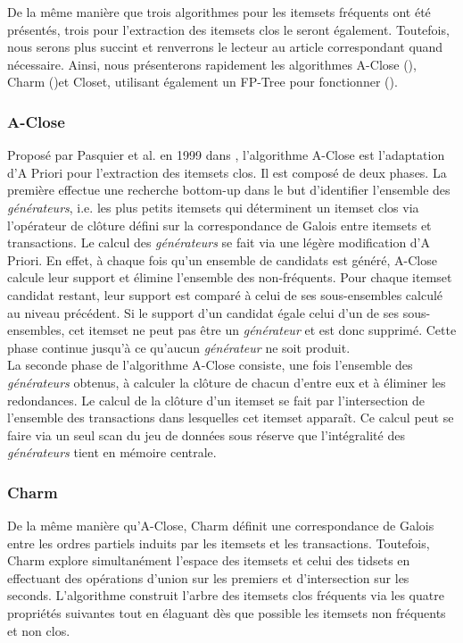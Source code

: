 \documentclass[a4paper,10pt]{report}
\begin{document}
De la même manière que trois algorithmes pour les itemsets fréquents ont été présentés, trois pour l'extraction des itemsets clos le seront également. Toutefois, nous serons plus succint et renverrons le lecteur au article correspondant quand nécessaire. Ainsi, nous présenterons rapidement les algorithmes A-Close (\cite{PAS99}), Charm (\cite{ZAK99})et Closet, utilisant également un FP-Tree pour fonctionner (\cite{PEI00}). \\

\subsubsection{A-Close}
\hspace{0.15cm}Proposé par Pasquier et al. en 1999 dans \cite{PAS99}, l'algorithme A-Close est l'adaptation d'A Priori  pour l'extraction des itemsets clos. Il est composé de deux phases. La première effectue une recherche bottom-up dans le but d'identifier l'ensemble des \emph{générateurs}, i.e. les plus petits itemsets qui déterminent un itemset clos via l'opérateur de clôture défini sur la correspondance de Galois entre itemsets et transactions. Le calcul des \emph{générateurs} se fait via une légère modification d'A Priori. En effet, à chaque fois qu'un ensemble de candidats est généré, A-Close calcule leur support et élimine l'ensemble des non-fréquents. Pour chaque itemset candidat restant, leur support est comparé à celui de ses sous-ensembles calculé au niveau précédent. Si le support d'un candidat égale celui d'un de ses sous-ensembles, cet itemset ne peut pas être un \emph{générateur} et est donc supprimé. Cette phase continue jusqu'à ce qu'aucun \emph{générateur} ne soit produit. \\

\hspace{0.15cm} La seconde phase de l'algorithme A-Close consiste, une fois l'ensemble des \emph{générateurs} obtenus, à calculer la clôture de chacun d'entre eux et à éliminer les redondances. Le calcul de la clôture d'un itemset se fait par l'intersection de l'ensemble des transactions dans lesquelles cet itemset apparaît. Ce calcul peut se faire via un seul scan du jeu de données sous réserve que l'intégralité des \emph{générateurs} tient en mémoire centrale.

\subsubsection{Charm}
\hspace{0.15cm} De la même manière qu'A-Close, Charm définit une correspondance de Galois entre les ordres partiels induits par les itemsets et les transactions. Toutefois, Charm explore simultanément l'espace des itemsets et celui des tidsets en effectuant des opérations d'union sur les premiers et d'intersection sur les seconds. L'algorithme construit l'arbre des itemsets clos fréquents via les quatre propriétés suivantes tout en élaguant dès que possible les itemsets non fréquents et non clos. \\
\end{document}
